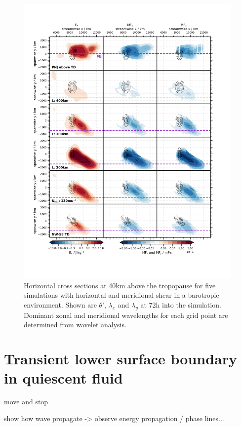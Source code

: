 \begin{figure}[tbp]
    \centering
    \includegraphics[width=0.99\textwidth]{figures_3D/waveletAna_fluxes_obs.png}
    \caption{Horizontal cross sections at 40km above the tropopause for five simulations with horizontal and meridional shear in a barotropic environment. Shown are $\theta$', $\lambda_x$ and $\lambda_y$ at 72h into the simulation. Dominant zonal and meridional wavelengths for each grid point are determined from wavelet analysis.}
    \label{fig:waveletAna_dudy}
\end{figure}


\section{Transient lower surface boundary in quiescent fluid}

move and stop 

show how wave propagate -> observe energy propagation / phase lines... 



